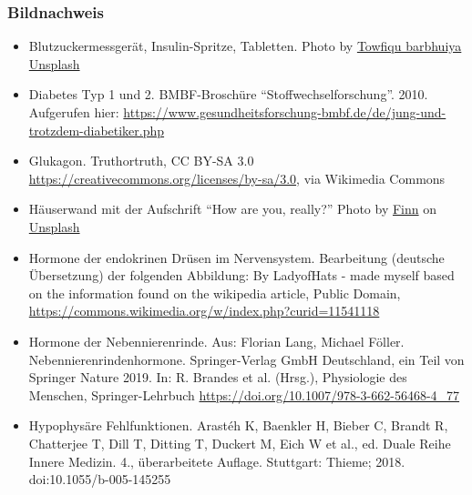 \documentclass{beamer}
\begin{document}
\begin{frame}
\frametitle{Bildnachweis}

\begin{tiny}
 
\begin{itemize}

\item
Blutzuckermessgerät, Insulin-Spritze, Tabletten. Photo by \href{https://unsplash.com/@towfiqu999999?utm_source=unsplash&utm_medium=referral&utm_content=creditCopyText}{Towfiqu barbhuiya} \href{https://unsplash.com/s/photos/insulin?utm_source=unsplash&utm_medium=referral&utm_content=creditCopyText}{Unsplash}
  
\item
Diabetes Typ 1 und 2. BMBF-Broschüre ``Stoffwechselforschung''. 2010. Aufgerufen hier: \url{https://www.gesundheitsforschung-bmbf.de/de/jung-und-trotzdem-diabetiker.php}

\item
Glukagon. Truthortruth, CC BY-SA 3.0 \url{https://creativecommons.org/licenses/by-sa/3.0}, via Wikimedia Commons

\item
Häuserwand mit der Aufschrift ``How are you, really?'' Photo by \href{https://unsplash.com/@finnnyc?utm_source=unsplash&utm_medium=referral&utm_content=creditCopyText}{Finn} on \href{https://unsplash.com/s/photos/hormones?utm_source=unsplash&utm_medium=referral&utm_content=creditCopyText}{Unsplash}
  

\item
Hormone der endokrinen Drüsen im Nervensystem. Bearbeitung (deutsche Übersetzung) der folgenden Abbildung: By LadyofHats - made myself based on the information found on the wikipedia article, Public Domain, \url{https://commons.wikimedia.org/w/index.php?curid=11541118}

\item
Hormone der Nebennierenrinde. Aus: Florian Lang, Michael Föller. Nebennierenrindenhormone. Springer-Verlag GmbH Deutschland, ein Teil von Springer Nature 2019. In: R. Brandes et al. (Hrsg.), Physiologie des Menschen, Springer-Lehrbuch \url{https://doi.org/10.1007/978-3-662-56468-4_77}


\item
Hypophysäre Fehlfunktionen. Arastéh K, Baenkler H, Bieber C, Brandt R, Chatterjee T, Dill T, Ditting T, Duckert M, Eich W et al., ed.  Duale Reihe Innere Medizin. 4., überarbeitete Auflage. Stuttgart: Thieme; 2018. doi:10.1055/b-005-145255


\end{itemize}
\end{tiny}
\end{frame}
\end{document}
